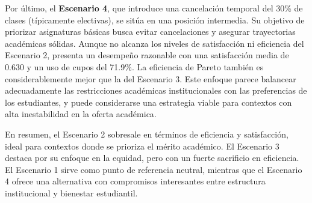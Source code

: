 \documentclass{article}
\begin{document}
Por último, el \textbf{Escenario 4}, que introduce una cancelación temporal del 30\% de clases (típicamente electivas), se sitúa en una posición intermedia. Su objetivo de priorizar asignaturas básicas busca evitar cancelaciones y asegurar trayectorias académicas sólidas. Aunque no alcanza los niveles de satisfacción ni eficiencia del Escenario 2, presenta un desempeño razonable con una satisfacción media de 0.630 y un uso de cupos del 71.9\%. La eficiencia de Pareto también es considerablemente mejor que la del Escenario 3. Este enfoque parece balancear adecuadamente las restricciones académicas institucionales con las preferencias de los estudiantes, y puede considerarse una estrategia viable para contextos con alta inestabilidad en la oferta académica.

En resumen, el Escenario 2 sobresale en términos de eficiencia y satisfacción, ideal para contextos donde se prioriza el mérito académico. El Escenario 3 destaca por su enfoque en la equidad, pero con un fuerte sacrificio en eficiencia. El Escenario 1 sirve como punto de referencia neutral, mientras que el Escenario 4 ofrece una alternativa con compromisos interesantes entre estructura institucional y bienestar estudiantil.
\end{document}
